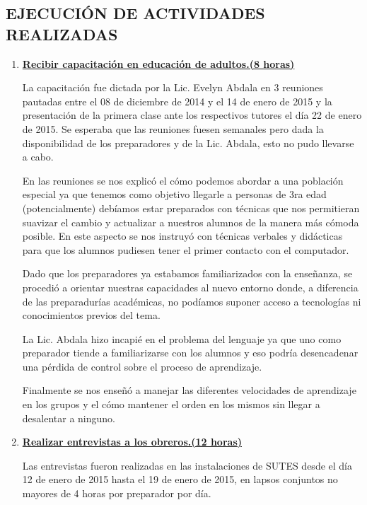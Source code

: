 \documentclass[letterpaper,12pt]{article}
\begin{document}
        \subsection{EJECUCIÓN DE ACTIVIDADES REALIZADAS}
         \begin{enumerate}
             \item \underline{\textbf{Recibir capacitación en educación de adultos.(8 horas)}}
             
             La capacitación fue dictada por la Lic. Evelyn Abdala en 3 reuniones pautadas entre el 08 de diciembre de 2014 y el 14 de enero de 2015 y la presentaci\'{o}n de la primera clase ante los respectivos tutores el d\'{i}a 22 de enero de 2015. Se esperaba que las reuniones fuesen semanales pero dada la disponibilidad de los preparadores y de la Lic. Abdala, esto no pudo llevarse a cabo.
             
             En las reuniones se nos explic\'{o} el c\'{o}mo podemos abordar a una población especial ya que tenemos como objetivo llegarle a personas de 3ra edad (potencialmente) debíamos estar preparados con técnicas que nos permitieran suavizar el cambio y actualizar a nuestros alumnos de la manera más cómoda posible. En este aspecto se nos instruyó con técnicas verbales y didácticas para que los alumnos pudiesen tener el primer contacto con el computador.
             
             Dado que los preparadores ya estabamos familiarizados con la enseñanza, se procedió a orientar nuestras capacidades al nuevo entorno donde, a diferencia de las preparadurías académicas, no podíamos suponer acceso a tecnologías ni conocimientos previos del tema.
             
             La Lic. Abdala hizo incapié en el problema del lenguaje ya que uno como preparador tiende a familiarizarse con los alumnos y eso podría desencadenar una pérdida de control sobre el proceso de aprendizaje.
             
             Finalmente se nos enseñó a manejar las diferentes velocidades de aprendizaje en los grupos y el cómo mantener el orden en los mismos sin llegar a desalentar a ninguno.
             
             \item \underline{\textbf{Realizar entrevistas a los obreros.(12 horas)}}
             
             Las entrevistas fueron realizadas en las instalaciones de SUTES desde el día 12 de enero de 2015 hasta el 19 de enero de 2015, en lapsos conjuntos no mayores de 4 horas por preparador por día.
             

\end{enumerate}
\end{document}
